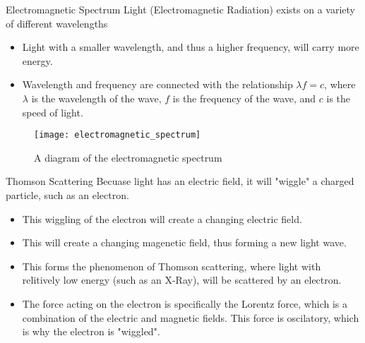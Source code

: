 \documentclass[aspectratio=169]{beamer}
\begin{document}
\begin{frame}[t]{Electromagnetic Spectrum}
	Light (Electromagnetic Radiation) exists on a variety of different wavelengths
	\begin{itemize}
			\item Light with a smaller wavelength, and thus a higher frequency, will carry more energy.
		\item Wavelength and frequency are connected with the relationship $\lambda f = c$, where $\lambda$ is the wavelength of the wave, $f$ is the frequency of the wave, and $c$ is the speed of light.
	\end{itemize}
	\begin{figure}
		\texttt{[image: electromagnetic\_spectrum]}
		\caption {A diagram of the electromagnetic spectrum}
	\end{figure}
\end{frame}

\begin{frame}[t]{Thomson Scattering}
  Becuase light has an electric field, it will "wiggle" a charged particle, such as an electron.
	\begin{itemize}
		\item This wiggling of the electron will create a changing electric field.
		\item This will create a changing magenetic field, thus forming a new light wave. 
		\item This forms the phenomenon of Thomson scattering, where light with relitively low energy (such as an X-Ray), will be scattered by an electron.
		\item The force acting on the electron is specifically the Lorentz force, which is a combination of the electric and magnetic fields. This force is oscilatory, which is why the electron is "wiggled".
	\end{itemize}
				
\end{frame}
\end{document}
